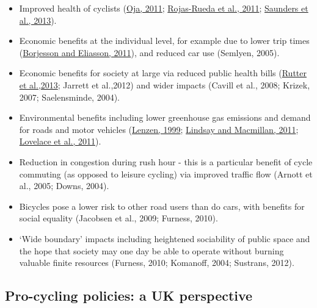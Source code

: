 \begin{itemize}
\item
  Improved health of cyclists
  (\href{http://www.fietsersbond.be/sites/default/files/Heath\%20benefits\%20of\%20cycling\%20REVIEW\%20\%28Oja\%202011\%29.pdf}{Oja,
  2011};
  \href{http://www.creal.cat/media/upload/pdf/articledavidrojas_editora_2_217_1.pdf}{Rojas-Rueda
  et al., 2011};
  \href{http://dx.plos.org/10.1371/journal.pone.0069912}{Saunders et
  al., 2013}).
\item
  Economic benefits at the individual level, for example due to lower
  trip times
  (\href{http://www.researchgate.net/publication/228341559_The_value_of_time_and_external_benefits_in_bicycle_cost-benefit_analysEs/file/e0b495165b88274e0c.pdf}{Borjesson
  and Eliasson, 2011}), and reduced car use (Semlyen, 2005).
\item
  Economic benefits for society at large via reduced public health bills
  (\href{http://www.sciencedirect.com/science/article/pii/S0749379712007301}{Rutter
  et al.,2013}; Jarrett et al.,2012) and wider impacts (Cavill et al.,
  2008; Krizek, 2007; Saelensminde, 2004).
\item
  Environmental benefits including lower greenhouse gas emissions and
  demand for roads and motor vehicles
  (\href{http://www.sciencedirect.com/science/article/B6VH8-3WMK47K-4/2/707d71a2636a20c4e40d703ae128b1c7}{Lenzen,
  1999};
  \href{http://onlinelibrary.wiley.com/doi/10.1111/j.1753-6405.2010.00621.x/abstract;jsessionid=111BFA6034AF092673E1C985C07238E8.f01t04?deniedAccessCustomisedMessage=\&userIsAuthenticated=false}{Lindsay
  and Macmillan, 2011};
  \href{http://linkinghub.elsevier.com/retrieve/pii/S0301421511000620}{Lovelace
  et al., 2011}).
\item
  Reduction in congestion during rush hour - this is a particular
  benefit of cycle commuting (as opposed to leisure cycling) via
  improved traffic flow (Arnott et al., 2005; Downs, 2004).
\item
  Bicycles pose a lower risk to other road users than do cars, with
  benefits for social equality (Jacobsen et al., 2009; Furness, 2010).
\item
  `Wide boundary' impacts including heightened sociability of public
  space and the hope that society may one day be able to operate without
  burning valuable finite resources (Furness, 2010; Komanoff, 2004;
  Sustrans, 2012).
\end{itemize}

\subsection{Pro-cycling policies: a UK
perspective}\label{pro-cycling-policies-a-uk-perspective}


